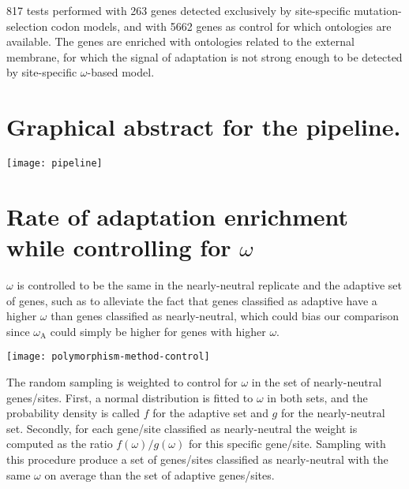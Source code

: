 \documentclass{article}
\renewcommand*{\bm}[1]{#1}%
\begin{document}
    817 tests performed with 263 genes detected exclusively by site-specific mutation-selection codon models, and with 5662 genes as control for which ontologies are available.
    The genes are enriched with ontologies related to the external membrane, for which the signal of adaptation is not strong enough to be detected by site-specific $\omega$-based model.

    

    \pagebreak


    \section{Graphical abstract for the pipeline.}
    \label{subsec:method-summary}

    \begin{center}
        \texttt{[image: pipeline]}
    \end{center}

    \pagebreak


    \section{Rate of adaptation enrichment while controlling for $\bm{\omega}$}
    \label{sec:controlling-for-omega}

    $\omega$ is controlled to be the same in the nearly-neutral replicate and the adaptive set of genes, such as to alleviate the fact that genes classified as adaptive have a higher $\omega$ than genes classified as nearly-neutral, which could bias our comparison since $\omega_{\mathrm{A}}$ could simply be higher for genes with higher $\omega$.

    \begin{center}
        \texttt{[image: polymorphism-method-control]}
    \end{center}

    The random sampling is weighted to control for $\omega$ in the set of nearly-neutral genes/sites.
    First, a normal distribution is fitted to $\omega$ in both sets, and the probability density is called $f$ for the adaptive set and $g$ for the nearly-neutral set.
    Secondly, for each gene/site classified as nearly-neutral the weight is computed as the ratio $f(\omega)/g(\omega)$ for this specific gene/site.
    Sampling with this procedure produce a set of genes/sites classified as nearly-neutral with the same $\omega$ on average than the set of adaptive genes/sites.
\end{document}
